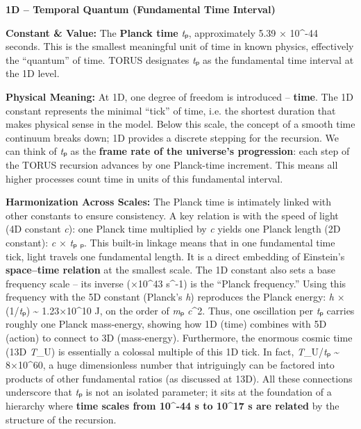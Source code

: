 \documentclass[
]{article}
\begin{document}
{\textbf{1D -- Temporal Quantum (Fundamental Time Interval)}

\textbf{Constant \& Value:} The \textbf{Planck time} \emph{t}ₚ,
approximately 5.39 × 10\^{}-44 seconds\hspace{0pt}. This is the smallest
meaningful unit of time in known physics, effectively the ``quantum'' of
time. TORUS designates \emph{t}ₚ as the fundamental time interval at the
1D level.

\textbf{Physical Meaning:} At 1D, one degree of freedom is introduced --
\textbf{time}. The 1D constant represents the minimal ``tick'' of time,
i.e. the shortest duration that makes physical sense in the
model\hspace{0pt}. Below this scale, the concept of a smooth time
continuum breaks down; 1D provides a discrete stepping for the
recursion. We can think of \emph{t}ₚ as the \textbf{frame rate of the
universe's progression}\hspace{0pt}: each step of the TORUS recursion
advances by one Planck-time increment. This means all higher processes
count time in units of this fundamental interval.

\textbf{Harmonization Across Scales:} The Planck time is intimately
linked with other constants to ensure consistency. A key relation is
with the speed of light (4D constant \emph{c}): one Planck time
multiplied by \emph{c} yields one Planck length (2D constant): \emph{c}
× \emph{t}ₚ \approx \emph{\ell}ₚ\hspace{0pt}. This built-in linkage means that in
one fundamental time tick, light travels one fundamental length. It is a
direct embedding of Einstein's \textbf{space--time relation} at the
smallest scale. The 1D constant also sets a base frequency scale -- its
inverse (×10\^{}43 s\^{}-1) is the ``Planck frequency.'' Using
this frequency with the 5D constant (Planck's \emph{h}) reproduces the
Planck energy: \emph{h} × (1/\emph{t}ₚ) \textasciitilde{} 1.23×10\^{}10
J, on the order of \emph{m}ₚ \emph{c}\^{}2\hspace{0pt}. Thus, one
oscillation per \emph{t}ₚ carries roughly one Planck mass-energy,
showing how 1D (time) combines with 5D (action) to connect to 3D
(mass-energy). Furthermore, the enormous cosmic time (13D
\emph{T}_{U}) is
essentially a colossal multiple of this 1D tick. In fact,
\emph{T}_{U}/\emph{t}ₚ
\textasciitilde{} 8×10\^{}60, a huge dimensionless number that
intriguingly can be factored into products of other fundamental ratios
(as discussed at 13D)\hspace{0pt}. All these connections underscore that
\emph{t}ₚ is not an isolated parameter; it sits at the foundation of a
hierarchy where \textbf{time scales from 10\^{}-44 s to 10\^{}17 s are
related} by the structure of the recursion.

}
\end{document}
